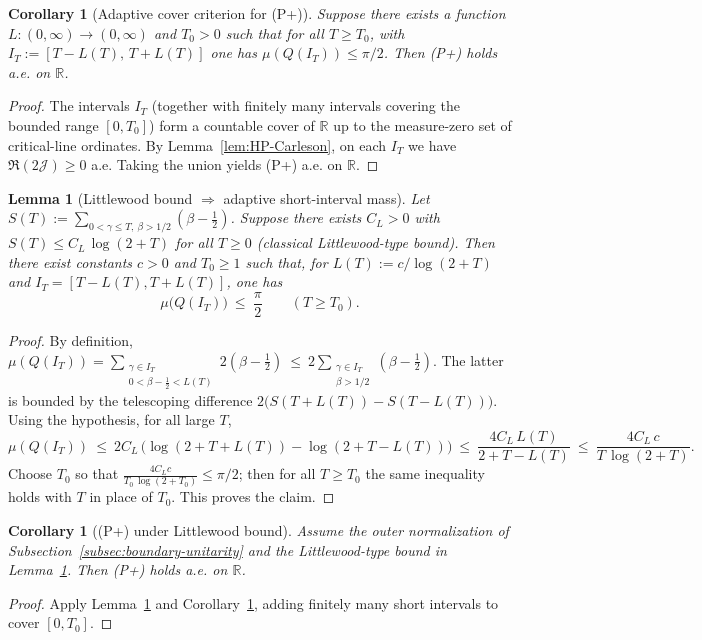 \documentclass[11pt]{article}
\newtheorem{lemma}[theorem]{Lemma}
\newtheorem{corollary}[theorem]{Corollary}
\theoremstyle{definition}
\theoremstyle{remark}
\newcommand{\R}{\mathbb{R}}
\begin{document}
\begin{corollary}[Adaptive cover criterion for (P+)]\label{cor:adaptive-cover}
Suppose there exists a function \(L:(0,\infty)\to(0,\infty)\) and \(T_0>0\) such that for all \(T\ge T_0\), with \(I_T:=[T-L(T),\,T+L(T)]\) one has \(\mu(Q(I_T))\le \pi/2\). Then \emph{(P+)} holds a.e. on \(\R\).
\end{corollary}
\begin{proof}
The intervals \(I_T\) (together with finitely many intervals covering the bounded range \([0,T_0]\)) form a countable cover of \(\R\) up to the measure-zero set of critical-line ordinates. By Lemma~\ref{lem:HP-Carleson}, on each \(I_T\) we have \(\Re(2\mathcal J)\ge 0\) a.e. Taking the union yields (P+) a.e. on \(\R\).
\end{proof}

\begin{lemma}[Littlewood bound \(\Rightarrow\) adaptive short-interval mass]\label{lem:littlewood-adaptive}
Let \(S(T):=\sum_{0<\gamma\le T,\ \beta>1/2}(\beta-\tfrac12)\). Suppose there exists \(C_L>0\) with \(S(T)\le C_L\,\log(2+T)\) for all \(T\ge 0\) (classical Littlewood-type bound). Then there exist constants \(c>0\) and \(T_0\ge 1\) such that, for \(L(T):=c/\log(2+T)\) and \(I_T=[T-L(T),T+L(T)]\), one has
\[\mu\big(Q(I_T)\big)\ \le\ \frac{\pi}{2}\qquad (T\ge T_0).\]
\end{lemma}
\begin{proof}
By definition, \(\mu(Q(I_T))=\sum_{\substack{\gamma\in I_T\\ 0<\beta-\tfrac12< L(T)}} 2(\beta-\tfrac12)\ \le\ 2\sum_{\substack{\gamma\in I_T\\ \beta>1/2}} (\beta-\tfrac12)\). The latter is bounded by the telescoping difference \(2\big(S(T+L(T)) - S(T-L(T))\big)\). Using the hypothesis, for all large \(T\),
\[
 \mu(Q(I_T))\ \le\ 2C_L\,\Big(\log(2+T+L(T)) - \log(2+T-L(T))\Big)
 \ \le\ \frac{4C_L\,L(T)}{2+T-L(T)}\ \le\ \frac{4C_L\,c}{T\,\log(2+T)}.
\]
Choose \(T_0\) so that \(\frac{4C_L c}{T_0\,\log(2+T_0)}\le \pi/2\); then for all \(T\ge T_0\) the same inequality holds with \(T\) in place of \(T_0\). This proves the claim.
\end{proof}

\begin{corollary}[(P+) under Littlewood bound]\label{cor:Pplus-Littlewood}
Assume the outer normalization of Subsection~\ref{subsec:boundary-unitarity} and the Littlewood-type bound in Lemma~\ref{lem:littlewood-adaptive}. Then \emph{(P+)} holds a.e. on \(\R\).
\end{corollary}
\begin{proof}
Apply Lemma~\ref{lem:littlewood-adaptive} and Corollary~\ref{cor:adaptive-cover}, adding finitely many short intervals to cover \([0,T_0]\).
\end{proof}
\end{document}
